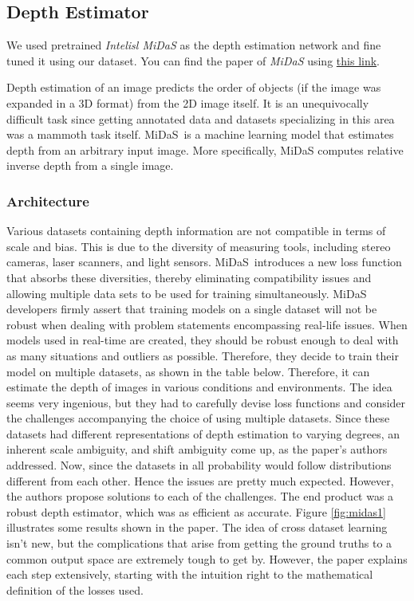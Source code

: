 \documentclass[a4paper, openany]{book}
\begin{document}
	
\newpage

\subsection{Depth Estimator}
	\vspace{0.3cm}

We used pretrained \textit{Intelisl MiDaS} as the depth estimation network and fine tuned it using our dataset. You can find the paper of \textit{MiDaS} using \href{https://arxiv.org/abs/1907.01341}{this link}.

Depth estimation of an image predicts the order of objects (if the image was expanded in a 3D format) from the 2D image itself. It is an unequivocally difficult task since getting annotated data and datasets specializing in this area was a mammoth task itself.
MiDaS is a machine learning model that estimates depth from an arbitrary input image. More specifically, MiDaS computes relative inverse depth from a single image.



\subsubsection{Architecture}
	\vspace{0.3cm}
	
Various datasets containing depth information are not compatible in terms of scale and bias. This is due to the diversity of measuring tools, including stereo cameras, laser scanners, and light sensors. MiDaS introduces a new loss function that absorbs these diversities, thereby eliminating compatibility issues and allowing multiple data sets to be used for training simultaneously.
MiDaS developers firmly assert that training models on a single dataset will not be robust when dealing with problem statements encompassing real-life issues. When models used in real-time are created, they should be robust enough to deal with as many situations and outliers as possible. Therefore, they decide to train their model on multiple datasets, as shown in the table below. Therefore, it can estimate the depth of images in various conditions and environments. 
The idea seems very ingenious, but they had to carefully devise loss functions and consider the challenges accompanying the choice of using multiple datasets. Since these datasets had different representations of depth estimation to varying degrees, an inherent scale ambiguity, and shift ambiguity come up, as the paper’s authors addressed.
Now, since the datasets in all probability would follow distributions different from each other. Hence the issues are pretty much expected. However, the authors propose solutions to each of the challenges. The end product was a robust depth estimator, which was as efficient as accurate. Figure \ref{fig:midas1} illustrates some results shown in the paper.
The idea of cross dataset learning isn’t new, but the complications that arise from getting the ground truths to a common output space are extremely tough to get by. However, the paper explains each step extensively, starting with the intuition right to the mathematical definition of the losses used.
\end{document}
